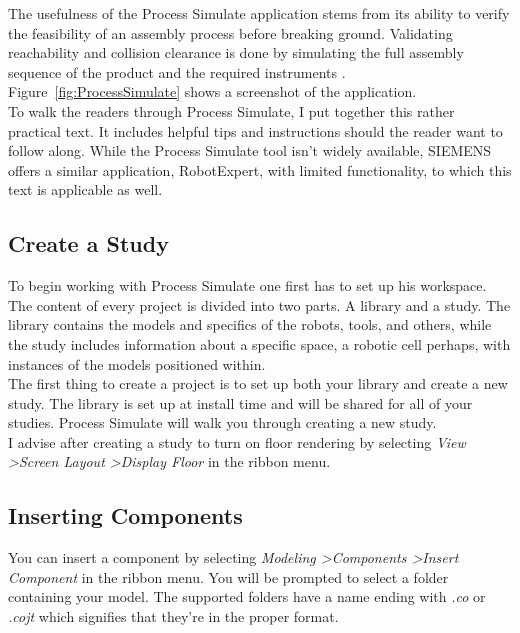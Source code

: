 The usefulness of the Process Simulate application stems from its ability to verify the feasibility of an assembly process before breaking ground. Validating reachability and collision clearance is done by simulating the full assembly sequence of the product and the required instruments \cite{ProcessSimulateProductPage}. Figure~\ref{fig:ProcessSimulate} shows a screenshot of the application. \\

To walk the readers through Process Simulate, I put together this rather practical text.
It includes helpful tips and instructions should the reader want to follow along.
While the Process Simulate tool isn't widely available, SIEMENS offers a similar application, RobotExpert, with limited functionality, to which this text is applicable as well. \\

\subsection{Create a Study}
To begin working with Process Simulate one first has to set up his workspace. The content of every project is divided into two parts. A library and a study.
The library contains the models and specifics of the robots, tools, and others, while the study includes information about a specific space, a robotic cell perhaps, with instances of the models positioned within. \\

The first thing to create a project is to set up both your library and create a new study.
The library is set up at install time and will be shared for all of your studies.
Process Simulate will walk you through creating a new study. \\

I advise after creating a study to turn on floor rendering by selecting \emph{View \textgreater Screen Layout \textgreater Display Floor} in the ribbon menu. \\

\subsection{Inserting Components}
You can insert a component by selecting \emph{Modeling \textgreater Components \textgreater Insert Component} in the ribbon menu.
You will be prompted to select a folder containing your model. 
The supported folders have a name ending with \emph{.co} or \emph{.cojt} which signifies that they're in the proper format. \\

